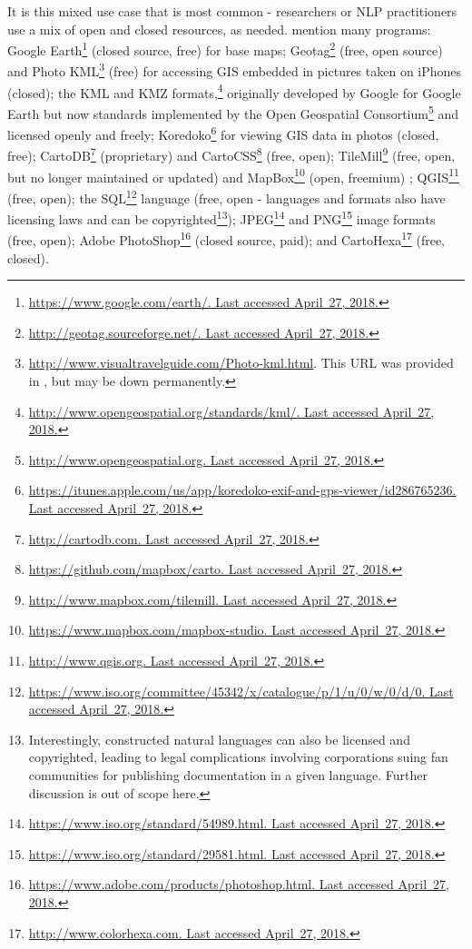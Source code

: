 It is this mixed use case that is most common - researchers or NLP practitioners use a mix of open and closed resources, as needed. \citet{gawne2016mapmaking} mention many programs: Google Earth\footnote{\href{https://www.google.com/earth/}{https://www.google.com/earth/. Last accessed April~27, 2018.}} (closed source, free) for base maps; Geotag\footnote{\href{http://geotag.sourceforge.net/}{http://geotag.sourceforge.net/. Last accessed April~27, 2018.}} (free, open source) and Photo KML\footnote{\href{http://www.visualtravelguide.com/Photo-kml.html}{http://www.visualtravelguide.com/Photo-kml.html}. This URL was provided in \citet{gawne2016mapmaking}, but may be down permanently.} (free) for accessing GIS embedded in pictures taken on iPhones (closed); the KML and KMZ formats,\footnote{\href{http://www.opengeospatial.org/standards/kml/}{http://www.opengeospatial.org/standards/kml/. Last accessed April~27, 2018.}} originally developed by Google for Google Earth but now standards implemented by the Open Geospatial Consortium\footnote{\href{http://www.opengeospatial.org}{http://www.opengeospatial.org. Last accessed April~27, 2018.}} and licensed openly and freely; Koredoko\footnote{\href{https://itunes.apple.com/us/app/koredoko-exif-and-gps-viewer/id286765236}{https://itunes.apple.com/us/app/koredoko-exif-and-gps-viewer/id286765236. Last accessed April~27, 2018.}} for viewing GIS data in photos (closed, free); CartoDB\footnote{\href{http://cartodb.com}{http://cartodb.com. Last accessed April~27, 2018.}} (proprietary) and CartoCSS\footnote{\href{https://github.com/mapbox/carto}{https://github.com/mapbox/carto. Last accessed April~27, 2018.}} (free, open); TileMill\footnote{\href{http://www.mapbox.com/tilemill}{http://www.mapbox.com/tilemill. Last accessed April~27, 2018.}} (free, open, but no longer maintained or updated) and MapBox\footnote{\href{https://www.mapbox.com/mapbox-studio/}{https://www.mapbox.com/mapbox-studio. Last accessed April~27, 2018.}} (open, freemium) ; QGIS\footnote{\href{http://www.qgis.org}{http://www.qgis.org. Last accessed April~27, 2018.}} (free, open); the SQL\footnote{\href{https://www.iso.org/committee/45342/x/catalogue/p/1/u/0/w/0/d/0}{https://www.iso.org/committee/45342/x/catalogue/p/1/u/0/w/0/d/0. Last accessed April~27, 2018.}} language (free, open - languages and formats also have licensing laws and can be copyrighted\footnote{Interestingly, constructed natural languages can also be licensed and copyrighted, leading to legal complications involving corporations suing fan communities for publishing documentation in a given language. Further discussion is out of scope here.}); JPEG\footnote{\href{https://www.iso.org/standard/54989.html}{https://www.iso.org/standard/54989.html. Last accessed April~27, 2018.}} and PNG\footnote{\href{https://www.iso.org/standard/29581.html}{https://www.iso.org/standard/29581.html. Last accessed April~27, 2018.}} image formats (free, open); Adobe PhotoShop\footnote{\href{https://www.adobe.com/products/photoshop.html}{https://www.adobe.com/products/photoshop.html. Last accessed April~27, 2018.}} (closed source, paid); and CartoHexa\footnote{\href{http://www.colorhexa.com}{http://www.colorhexa.com. Last accessed April~27, 2018.}} (free, closed).

